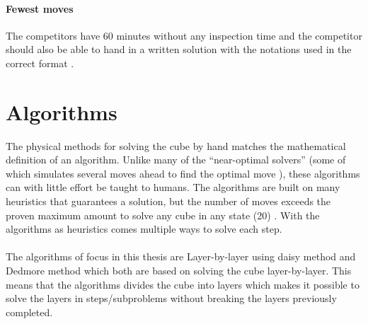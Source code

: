 \documentclass[a4paper,11pt]{kth-mag}
\begin{document}
\paragraph{Fewest moves}
The competitors have 60 minutes without any inspection time and the competitor should also be able to hand in a written solution with the notations used in the correct format \cite{WCA2}.
\section{Algorithms}
The physical methods for solving the cube by hand matches the mathematical definition of an algorithm. Unlike many of the “near-optimal solvers” (some of which simulates several moves ahead to find the optimal move \cite{Kociemba}), these algorithms can with little effort be taught to humans. The algorithms are built on many heuristics that guarantees a solution, but the number of moves exceeds the proven maximum amount to solve any cube in any state (20) \cite{cube20}. With the algorithms as heuristics comes multiple ways to solve each step.\\\\
The algorithms of focus in this thesis are Layer-by-layer using daisy method and Dedmore method which both are based on solving the cube layer-by-layer. This means that the algorithms divides the cube into layers which makes it possible to solve the layers in steps/subproblems without breaking the layers previously completed.
\end{document}
